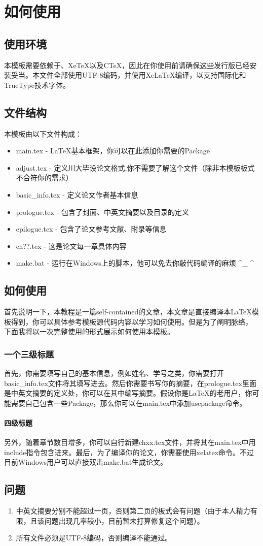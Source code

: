 \chapter{如何使用}
\section{使用环境}
本模板需要依赖于\LaTeXe 、Xe\TeX 以及C\TeX ，因此在你使用前请确保这些发行版已经安装妥当。本文件全部使用UTF-8编码，并使用Xe\LaTeX 编译，以支持国际化和TrueType技术字体。

\section{文件结构}
本模板由以下文件构成：
\begin{itemize}
\item main.tex - \LaTeX 基本框架，你可以在此添加你需要的Package
\item adjust.tex - 定义川大毕设论文格式,你不需要了解这个文件（除非本模板板式不合符你的需求）
\item basic\_info.tex - 定义论文作者基本信息
\item prologue.tex - 包含了封面、中英文摘要以及目录的定义
\item epilogue.tex - 包含了论文参考文献、附录等信息
\item ch??.tex - 这是论文每一章具体内容
\item make.bat - 运行在Windows上的脚本，他可以免去你敲代码编译的麻烦 \textasciicircum \_ \textasciicircum
\end{itemize}

\section{如何使用}
首先说明一下，本教程是一篇self-contained的文章，本文章是直接编译本\LaTeX 模板得到，你可以具体参考模板源代码内容以学习如何使用。但是为了阐明脉络， 下面我将以一次完整使用的形式展示如何使用本模板。
\subsection{一个三级标题}
首先，你需要填写自己的基本信息，例如姓名、学号之类，你需要打开basic\_info.tex文件将其填写进去。然后你需要书写你的摘要，在prologue.tex里面是中英文摘要的定义处，你可以在其中编写摘要。假设你是\LaTeX 的老用户，你可能需要自己包含一些Package，那么你可以在main.tex中添加usepackage命令。
\subsubsection{四级标题}
另外，随着章节数目增多，你可以自行新建chxx.tex文件，并将其在main.tex中用include指令包含进来。最后，为了编译你的论文，你需要使用xelatex命令。不过目前Windows用户可以直接双击make.bat生成论文。

\section{问题}
\begin{enumerate}
\item 中英文摘要分别不能超过一页，否则第二页的板式会有问题（由于本人精力有限，且该问题出现几率较小，目前暂未打算修复这个问题）。
\item 所有文件必须是UTF-8编码，否则编译不能通过。
\end{enumerate}